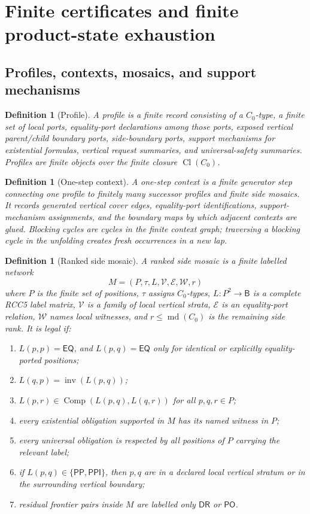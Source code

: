 \documentclass[11pt]{article}
\newtheorem{definition}[theorem]{Definition}
\newcommand{\Base}{\mathsf B}
\newcommand{\EQ}{\mathsf{EQ}}
\newcommand{\DR}{\mathsf{DR}}
\newcommand{\PO}{\mathsf{PO}}
\newcommand{\PP}{\mathsf{PP}}
\newcommand{\PPI}{\mathsf{PPI}}
\newcommand{\Inv}{\operatorname{inv}}
\newcommand{\comp}{\operatorname{Comp}}
\newcommand{\Cl}{\operatorname{Cl}}
\newcommand{\md}{\operatorname{md}}
\begin{document}
\section{Finite certificates and finite product-state exhaustion}

\subsection{Profiles, contexts, mosaics, and support mechanisms}

\begin{definition}[Profile]
A profile is a finite record consisting of a $C_0$-type, a finite set of local ports, equality-port declarations among those ports, exposed vertical parent/child boundary ports, side-boundary ports, support mechanisms for existential formulas, vertical request summaries, and universal-safety summaries.  Profiles are finite objects over the finite closure $\Cl(C_0)$.
\end{definition}

\begin{definition}[One-step context]
A one-step context is a finite generator step connecting one profile to finitely many successor profiles and finite side mosaics.  It records generated vertical cover edges, equality-port identifications, support-mechanism assignments, and the boundary maps by which adjacent contexts are glued.  Blocking cycles are cycles in the finite context graph; traversing a blocking cycle in the unfolding creates fresh occurrences in a new lap.
\end{definition}

\begin{definition}[Ranked side mosaic]\label{def:ranked-mosaic}
A ranked side mosaic is a finite labelled network
\[
   M=(P,\tau,L,\mathcal V,\mathcal E,\mathcal W,r)
\]
where $P$ is the finite set of positions, $\tau$ assigns $C_0$-types, $L:P^2\to\Base$ is a complete RCC5 label matrix, $\mathcal V$ is a family of local vertical strata, $\mathcal E$ is an equality-port relation, $\mathcal W$ names local witnesses, and $r\leq\md(C_0)$ is the remaining side rank.  It is legal if:
\begin{enumerate}[label=(M\arabic*)]
\item $L(p,p)=\EQ$, and $L(p,q)=\EQ$ only for identical or explicitly equality-ported positions;
\item $L(q,p)=\Inv(L(p,q))$;
\item $L(p,r)\in\comp(L(p,q),L(q,r))$ for all $p,q,r\in P$;
\item every existential obligation supported in $M$ has its named witness in $P$;
\item every universal obligation is respected by all positions of $P$ carrying the relevant label;
\item if $L(p,q)\in\{\PP,\PPI\}$, then $p,q$ are in a declared local vertical stratum or in the surrounding vertical boundary;
\item residual frontier pairs inside $M$ are labelled only $\DR$ or $\PO$.
\end{enumerate}
\end{definition}
\end{document}
